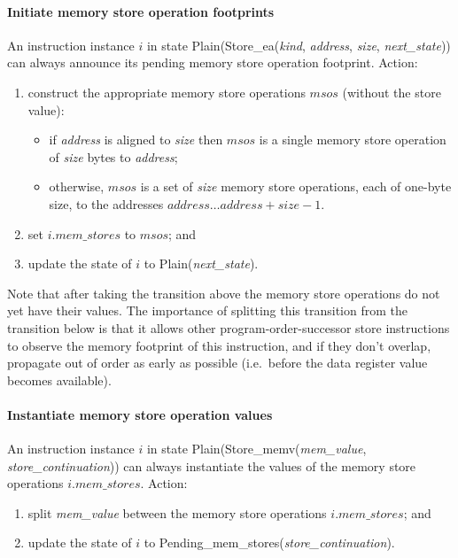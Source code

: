 \paragraph{Initiate memory store operation footprints}\label{omm:initiate_store_footprint}
An instruction instance $i$ in state {\sc Plain}({\sc Store\_ea}({\it kind}, {\it address}, {\it size}, {\it next\_state})) can always announce its pending memory store operation footprint.
Action:
\begin{enumerate}
\item construct the appropriate memory store operations $msos$ (without the store value):
  \begin{itemize}
  \item if {\it address} is aligned to {\it size} then $msos$ is a single memory store operation of {\it size} bytes to {\it address};
  \item otherwise, $msos$ is a set of {\it size} memory store operations, each of one-byte size, to the addresses $\textit{address}\ldots\textit{address}+\textit{size}-1$.
  \end{itemize}
\item set $i.\textit{mem\_stores}$ to $msos$; and
\item update the state of $i$ to {\sc Plain}({\it next\_state}).
\end{enumerate}

\begin{commentary}
Note that after taking the transition above the memory store operations do not yet have their values.
The importance of splitting this transition from the transition below is that it allows other program-order-successor store instructions to observe the memory footprint of this instruction, and if they don't overlap, propagate out of order as early as possible (i.e.~before the data register value becomes available).
\end{commentary}


\paragraph{Instantiate memory store operation values}\label{omm:instantiate_store_value}
An instruction instance $i$ in state {\sc Plain}({\sc Store\_memv}({\it mem\_value}, {\it store\_continuation})) can always instantiate the values of the memory store operations $i.\textit{mem\_stores}$.
Action:
\begin{enumerate}
\item split {\it mem\_value} between the memory store operations $i.\textit{mem\_stores}$; and
\item update the state of $i$ to {\sc Pending\_mem\_stores}({\it store\_continuation}).
\end{enumerate}


